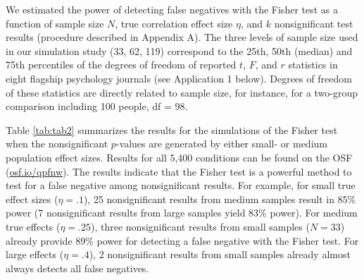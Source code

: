 \documentclass{article}
\begin{document}
We estimated the power of detecting false negatives with the Fisher test as a function of sample size $N$, true correlation effect size $\eta$, and $k$ nonsignificant test results (procedure described in Appendix A). The three levels of sample size used in our simulation study (33, 62, 119) correspond to the  25th, 50th (median) and 75th percentiles of the degrees of freedom of reported $t$, $F$, and $r$ statistics in eight flagship psychology journals (see Application 1 below). Degrees of freedom of these statistics are directly related to sample size, for instance, for a two-group comparison including 100 people, df = 98. 

Table \ref{tab:tab2} summarizes the results for the simulations of the Fisher test when the nonsignificant $p$-values are generated by either small- or medium population effect sizes. Results for all 5,400 conditions can be found on the OSF (\url{osf.io/qpfnw}). The results indicate that the Fisher test is a powerful method to test for a false negative among nonsignificant results. For example, for small true effect sizes ($\eta=.1$), 25 nonsignificant results from medium samples result in 85\% power (7 nonsignificant results from large samples yield 83\% power). For medium true effects ($\eta=.25$), three nonsignificant results from small samples ($N=33$) already provide 89\% power for detecting a false negative with the Fisher test. For large effects ($\eta=.4$), 2 nonsignificant results from small samples already almost always detects all false negatives.
\end{document}
